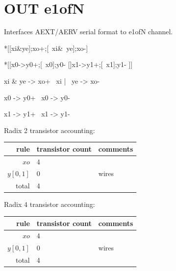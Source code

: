 \documentclass{article}
\begin{document}
\noindent\makebox[\linewidth]{\rule{\textwidth}{1pt}}

\section{OUT e1ofN \label{sec:OUT_e1ofN}}

Interfaces AEXT/AERV serial format to e1ofN channel.

\begin{hse}
*[[xi&ye];xo+;[~xi&~ye];xo-]

*[[x0->y0+;[~x0];y0-
  []x1->y1+;[~x1];y1-
 ]]
\end{hse}

\begin{prs2}
xi & ye -> xo+
~xi | ~ye -> xo-
\end{prs2}

\begin{prs2}
x0 -> y0+
~x0 -> y0-

x1 -> y1+
~x1 -> y1-
\end{prs2}

\noindent
Radix 2 transistor accounting:

\begin{center}
    \begin{tabular}{|r|l|l|}
    \hline
    rule & transistor count & comments \\ \hline
    $xo$ & 4 & \\ \hline
    $y[0,1]$ & 0 & wires \\ \hline
    \hline total & 4 & \\ \hline
    \end{tabular}
\end{center}

\noindent
Radix 4 transistor accounting:

\begin{center}
    \begin{tabular}{|r|l|l|}
    \hline
    rule & transistor count & comments \\ \hline
    $xo$ & 4 & \\ \hline
    $y[0,1]$ & 0 & wires \\ \hline
    \hline total & 4 & \\ \hline
    \end{tabular}
\end{center}

\end{document}
